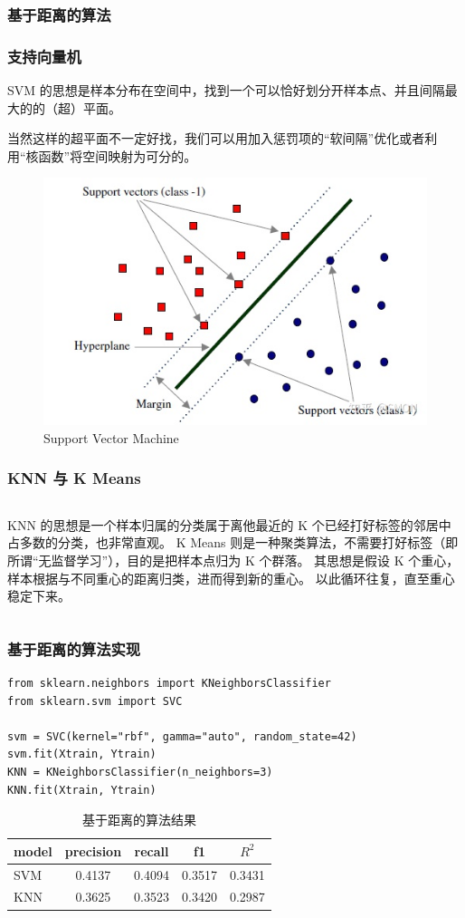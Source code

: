\documentclass[mathserif,envcountsect,fontset=mac]{ctexbeamer}
\begin{document}
\subsubsection{基于距离的算法}
\begin{frame}
    \frametitle{支持向量机}
    SVM 的思想是样本分布在空间中，找到一个可以恰好划分开样本点、并且间隔最大的的（超）平面。

    当然这样的超平面不一定好找，我们可以用加入惩罚项的“软间隔”优化或者利用“核函数”将空间映射为可分的。

    \begin{center}
        \begin{figure}
            \includegraphics[width=0.6\linewidth]{../lib/SVM.jpeg}
            \caption{Support Vector Machine}
            \label{SVM}
        \end{figure}
    \end{center}
\end{frame}
\begin{frame}
    \frametitle{KNN 与 K Means}
    \begin{columns}
        KNN 的思想是一个样本归属的分类属于离他最近的 K 个已经打好标签的邻居中占多数的分类，也非常直观。
        K Means 则是一种聚类算法，不需要打好标签（即所谓“无监督学习”），目的是把样本点归为 K 个群落。
        其思想是假设 K 个重心，样本根据与不同重心的距离归类，进而得到新的重心。
        以此循环往复，直至重心稳定下来。
    \end{columns}
\end{frame}
\begin{frame}[fragile]
    \frametitle{基于距离的算法实现}
    \begin{verbatim}
from sklearn.neighbors import KNeighborsClassifier
from sklearn.svm import SVC

svm = SVC(kernel="rbf", gamma="auto", random_state=42)
svm.fit(Xtrain, Ytrain)
KNN = KNeighborsClassifier(n_neighbors=3)
KNN.fit(Xtrain, Ytrain)
    \end{verbatim}
    \begin{table}
        \caption{基于距离的算法结果}
        \begin{tabular}{l|cccc}
            model & precision & recall & f1     & \(R^2\) \\ \hline
            SVM   & 0.4137    & 0.4094 & 0.3517 & 0.3431  \\
            KNN   & 0.3625    & 0.3523 & 0.3420 & 0.2987  \\
        \end{tabular}
        \label{distances}
    \end{table}
\end{frame}
\end{document}

